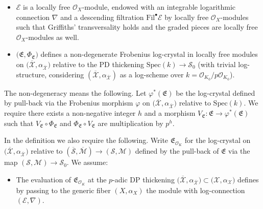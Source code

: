 \documentclass[asterisque,english]{smfart}
\begin{document}
\medskip
\begin{itemize}

\item[i.] $\mathcal{E}$ is a locally free $\mathcal{O}_X$-module, endowed with an integrable logarithmic connection $\nabla$ and a descending filtration $\mathrm{Fil}^\bullet \mathcal{E}$ by locally free $\mathcal{O}_X$-modules such that Griffiths' transversality holds and the graded pieces are locally free $\mathcal{O}_X$-modules as well.


\item[ii.]  $\bigl(\mathfrak{E},\Phi_{\mathfrak{E}}\bigr)$ defines a non-degenerate Frobenius log-crystal in locally free modules on $\bigl(\overline{\mathcal{X}},\alpha_{\overline{\mathcal{X}}}\bigr)$ relative to the PD thickening  $\mathrm{Spec}(k) \to \mathcal{S}_0$ (with trivial log-structure, considering $ (\overline{\mathcal{X}},\alpha_{\overline{\mathcal{X}}}) $ as a log-scheme over  $k=\mathcal{O}_{K_0}/p\mathcal{O}_{K_0}$).

\end{itemize}
\smallskip
The non-degeneracy means the following. Let $\varphi^\ast(\mathfrak{E})$ be the log-crystal defined by pull-back via the Frobenius morphism $\varphi$ on  $\bigl(\overline{\mathcal{X}},\alpha_{\overline{\mathcal{X}}}\bigr)$ relative to $\mathrm{Spec}(k)$. We require there exists a non-negative integer $h$ and a morphism $V_{\mathfrak{E}}\colon \mathfrak{E} \to \varphi^\ast(\mathfrak{E})$ such that $V_{\mathfrak{E}} \circ \Phi_{\mathfrak{E}}$ and $\Phi_{\mathfrak{E}}\circ V_{\mathfrak{E}} $ are multiplication by $p^h$.  

In the definition we also require the following.  Write $\mathfrak{E}_{\mathcal{O}_K}$ for the log-crystal on $\bigl(\overline{\mathcal{X}},\alpha_{\overline{\mathcal{X}}}\bigr)$ relative to $(\overline{\mathcal{S}},\overline{\mathcal{M}} )\to  (\mathcal{S},\mathcal{M})$ defined by  the pull-back of $\mathfrak{E}$  via  the map $ (\mathcal{S},\mathcal{M}) \to \mathcal{S}_0$. We assume:
\smallskip


\begin{itemize}
\item[iii.]    The evaluation of $\mathfrak{E}_{\mathcal{O}_K} $ at the $p$-adic DP thickening $\bigl(\overline{\mathcal{X}},\alpha_{\overline{\mathcal{X}}}\bigr) \subset \bigl( \mathcal{X},\alpha_{\mathcal{X}}\bigr)$ defines by passing to the generic fiber $(X,\alpha_X)$ the module with log-connection  $(\mathcal{E},\nabla)$.


\end{itemize}
\end{document}
